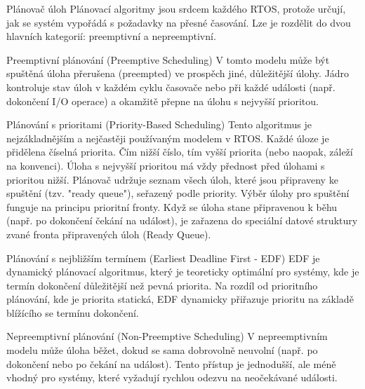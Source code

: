 \chap Plánovač úloh
Plánovací algoritmy jsou srdcem každého RTOS, protože určují, jak se systém vypořádá s požadavky na přesné časování. Lze je rozdělit do dvou hlavních kategorií: preemptivní a nepreemptivní.

\sec Preemptivní plánování (Preemptive Scheduling)
V tomto modelu může být spuštěná úloha přerušena (preempted) ve prospěch jiné, důležitější úlohy. Jádro kontroluje stav úloh v každém cyklu časovače nebo při každé události (např. dokončení I/O operace) a okamžitě přepne na úlohu s nejvyšší prioritou.

\secc Plánování s prioritami (Priority-Based Scheduling)
Tento algoritmus je nejzákladnějším a nejčastěji používaným modelem v RTOS. Každé úloze je přidělena číselná priorita. Čím nižší číslo, tím vyšší priorita (nebo naopak, záleží na konvenci). Úloha s nejvyšší prioritou má vždy přednost před úlohami s prioritou nižší. Plánovač udržuje seznam všech úloh, které jsou připraveny ke spuštění (tzv. "ready queue"), seřazený podle priority. Výběr úlohy pro spuštění funguje na principu prioritní fronty. Když se úloha stane připravenou k běhu (např. po dokončení čekání na událost), je zařazena do speciální datové struktury zvané fronta připravených úloh (Ready Queue).

\secc Plánování s nejbližším termínem (Earliest Deadline First - EDF)
EDF je dynamický plánovací algoritmus, který je teoreticky optimální pro systémy, kde je termín dokončení důležitější než pevná priorita. Na rozdíl od prioritního plánování, kde je priorita statická, EDF dynamicky přiřazuje prioritu na základě blížícího se termínu dokončení.

\sec Nepreemptivní plánování (Non-Preemptive Scheduling)
V nepreemptivním modelu může úloha běžet, dokud se sama dobrovolně neuvolní (např. po dokončení nebo po čekání na událost). Tento přístup je jednodušší, ale méně vhodný pro systémy, které vyžadují rychlou odezvu na neočekávané události.


